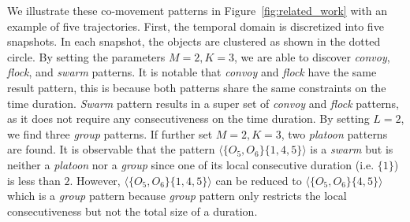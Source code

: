 We illustrate these co-movement patterns in Figure~\ref{fig:related_work} with an example of five trajectories.
First, the temporal domain is discretized into five snapshots. 
In each snapshot, the objects are clustered as shown in the dotted circle.
By setting the parameters $M=2, K=3$, we are able to discover \emph{convoy}, \emph{flock}, and \emph{swarm} patterns. 
It is notable that \emph{convoy} and \emph{flock} have the same result pattern, this is because both patterns share 
the same constraints on the time duration. 
\emph{Swarm} pattern results in a super set of \emph{convoy} and \emph{flock} patterns, as it 
does not require any consecutiveness on the time duration. By setting $L=2$, we find three \emph{group} patterns. 
If further set $M=2,K=3$, two \emph{platoon} patterns are found. It is observable that the pattern $\langle\{O_5,O_6\}\{1,4,5\} \rangle$ is a \emph{swarm} but is neither a \emph{platoon} nor a \emph{group} since one of its local consecutive duration (i.e. $\{1\}$) is less than $2$. However, $\langle\{O_5,O_6\}\{1,4,5\} \rangle$ can be reduced to $\langle\{O_5,O_6\}\{4,5\} \rangle$ which is a \emph{group} pattern because \emph{group} pattern only restricts the local consecutiveness but not the total size of a duration. 

% 
%

